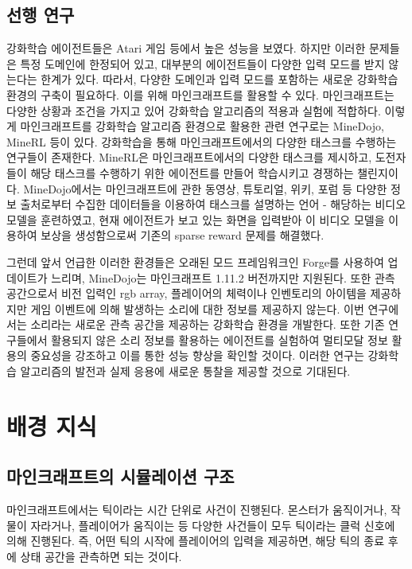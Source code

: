 \documentclass[oneside, under, ko]{snuthesis}
\begin{document}
\section{선행 연구}
강화학습 에이전트들은 Atari 게임 등에서 높은 성능을 보였다. 하지만 이러한 문제들은 특정 도메인에 한정되어 있고, 대부분의 에이전트들이 다양한 입력 모드를 받지 않는다는 한계가 있다. 따라서, 다양한 도메인과 입력 모드를 포함하는 새로운 강화학습 환경의 구축이 필요하다. 이를 위해 마인크래프트를 활용할 수 있다. 마인크래프트는 다양한 상황과 조건을 가지고 있어 강화학습 알고리즘의 적용과 실험에 적합하다. 이렇게 마인크래프트를 강화학습 알고리즘 환경으로 활용한 관련 연구로는 MineDojo, MineRL 등이 있다. 강화학습을 통해 마인크래프트에서의 다양한 태스크를 수행하는 연구들이 존재한다. MineRL은 마인크래프트에서의 다양한 태스크를 제시하고, 도전자들이 해당 태스크를 수행하기 위한 에이전트를 만들어 학습시키고 경쟁하는 챌린지이다. \cite{minerl} MineDojo에서는 마인크래프트에 관한 동영상, 튜토리얼, 위키, 포럼 등 다양한 정보 출처로부터 수집한 데이터들을 이용하여 태스크를 설명하는 언어 - 해당하는 비디오 모델을 훈련하였고, 현재 에이전트가 보고 있는 화면을 입력받아 이 비디오 모델을 이용하여 보상을 생성함으로써 기존의 sparse reward 문제를 해결했다. \cite{minedojo}

그런데 앞서 언급한 이러한 환경들은 오래된 모드 프레임워크인 Forge를 사용하여 업데이트가 느리며, MineDojo는 마인크래프트 1.11.2 버전까지만 지원된다. \cite{minedojoGithub} 또한 관측 공간으로서 비전 입력인 rgb array, 플레이어의 체력이나 인벤토리의 아이템을 제공하지만 게임 이벤트에 의해 발생하는 소리에 대한 정보를 제공하지 않는다. 이번 연구에서는 소리라는 새로운 관측 공간을 제공하는 강화학습 환경을 개발한다. 또한 기존 연구들에서 활용되지 않은 소리 정보를 활용하는 에이전트를 실험하여 멀티모달 정보 활용의 중요성을 강조하고 이를 통한 성능 향상을 확인할 것이다. 이러한 연구는 강화학습 알고리즘의 발전과 실제 응용에 새로운 통찰을 제공할 것으로 기대된다.


\chapter{배경 지식}
\section{마인크래프트의 시뮬레이션 구조}
마인크래프트에서는 틱이라는 시간 단위로 사건이 진행된다. 몬스터가 움직이거나, 작물이 자라거나, 플레이어가 움직이는 등 다양한 사건들이 모두 틱이라는 클럭 신호에 의해 진행된다. 즉, 어떤 틱의 시작에 플레이어의 입력을 제공하면, 해당 틱의 종료 후에 상태 공간을 관측하면 되는 것이다.
\end{document}
